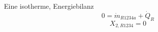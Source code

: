

\item[(b)] Eine isotherme, Energiebilanz
    \[
    0 = \dot{m}_{R1234a} + \dot{Q}_{R}
    \]
    \[
    X_{2, R1234} = 0
    \]